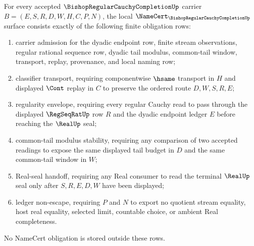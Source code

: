 \begin{theorem}
\label{thm:bishop-regular-cauchy-completion-regularity-envelope}
For every accepted $\BishopRegularCauchyCompletionUp$ carrier $B=(E,S,R,D,W,H,C,P,N)$, the local $\NameCert_{\BishopRegularCauchyCompletionUp}$ surface consists exactly of the following finite obligation rows:
\begin{enumerate}
\item carrier admission for the dyadic endpoint row, finite stream observations, regular rational sequence row, dyadic tail modulus, common-tail window, transport, replay, provenance, and local naming row;
\item classifier transport, requiring componentwise $\hsame$ transport in $H$ and displayed $\Cont$ replay in $C$ to preserve the ordered route $D,W,S,R,E$;
\item regularity envelope, requiring every regular Cauchy read to pass through the displayed $\RegSeqRatUp$ row $R$ and the dyadic endpoint ledger $E$ before reaching the $\RealUp$ seal;
\item common-tail modulus stability, requiring any comparison of two accepted readings to expose the same displayed tail budget in $D$ and the same common-tail window in $W$;
\item Real-seal handoff, requiring any Real consumer to read the terminal $\RealUp$ seal only after $S,R,E,D,W$ have been displayed;
\item ledger non-escape, requiring $P$ and $N$ to export no quotient stream equality, host real equality, selected limit, countable choice, or ambient Real completeness.
\end{enumerate}
No NameCert obligation is stored outside these rows.
\end{theorem}
